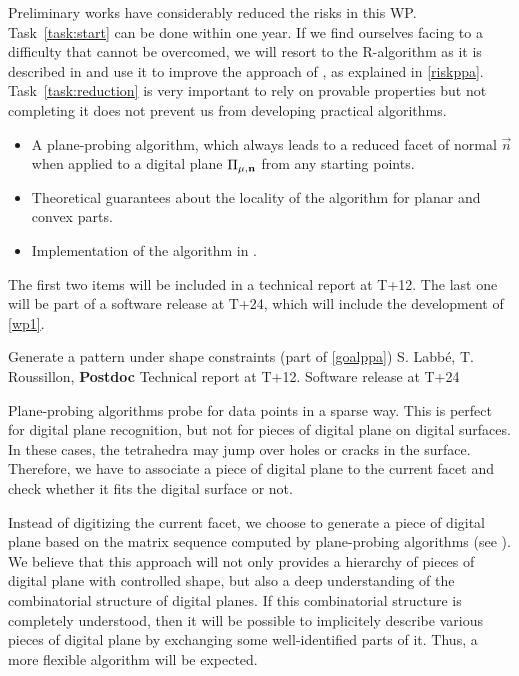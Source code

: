 \Risks
Preliminary works have considerably reduced the risks in this WP. Task~\ref{task:start}
can be done within one year. If we find ourselves facing to a difficulty that cannot be overcomed,
we will resort to the R-algorithm as it is described in \cite{LPRJMIV2017} and use it
to improve the approach of \citeauthor*{Charrier2011} \cite{Charrier2011}, as explained
in \ref{riskppa}. Task~\ref{task:reduction} is very important to rely on provable
properties but not completing it does not prevent us from developing practical algorithms.

\Success
\begin{itemize}
    \item A plane-probing algorithm, which always leads to a
      reduced facet of normal $\vec{n}$ when applied to a digital
      plane $\Pi_{\mu,\mathbf{n}}$ from any starting points.
    \item Theoretical guarantees about the locality of the algorithm
      for planar and convex parts.   
    \item Implementation of the algorithm in \DGtal.   
\end{itemize}
The first two items will be included in a technical report at T+12.
The last one will be part of a software release at T+24, which will include
the development of \ref{wp1}. 

  

\medskip
{}
   {Generate a pattern under shape constraints (part of \ref{goalppa})}
   {S. Labb\'{e}, T. Roussillon, \textbf{Postdoc}}
   {Technical report at T+12. Software release at T+24}
\medskip

Plane-probing algorithms probe for data points in a sparse way.
This is perfect for digital plane recognition, but not for pieces
of digital plane on digital surfaces. In these cases, the tetrahedra
may jump over holes or cracks in the surface. Therefore, we have to
associate a piece of digital plane to the current facet and check
whether it fits the digital surface or not.

Instead of digitizing the current facet, we choose to generate a piece
of digital plane based on the matrix sequence computed by
plane-probing algorithms (see ). We believe that
this approach will not only provides a hierarchy of pieces of digital
plane with controlled shape, but also a deep understanding of the
combinatorial structure of digital planes. If this combinatorial
structure is completely understood, then it will be possible to implicitely
describe various pieces of digital plane by exchanging some well-identified
parts of it. Thus, a more flexible algorithm will be expected.  

